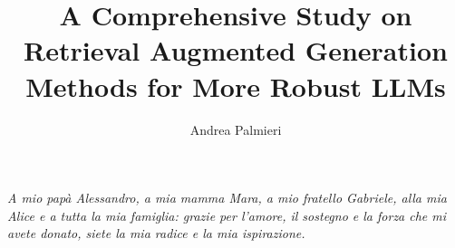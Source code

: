 \documentclass{styles/tthesis} %
\title{A Comprehensive Study on Retrieval Augmented Generation Methods for More Robust LLMs}
\author{Andrea Palmieri}
\begin{document}
\printfrontpage



\chapter*{\mbox{}}
\begin{flushright}
  \thispagestyle{empty}
  \null{}
  {\it A mio papà Alessandro, a mia mamma Mara, a mio fratello Gabriele, alla mia Alice e a tutta la mia famiglia: grazie per l’amore, il sostegno e la forza che mi avete donato, siete la mia radice e la mia ispirazione. }
  \null
\end{flushright}
\thispagestyle{empty}
\mbox{}
\newpage



\tableofcontents

\mainmatter










\label{Bibliography}
\printbibliography
\end{document}
